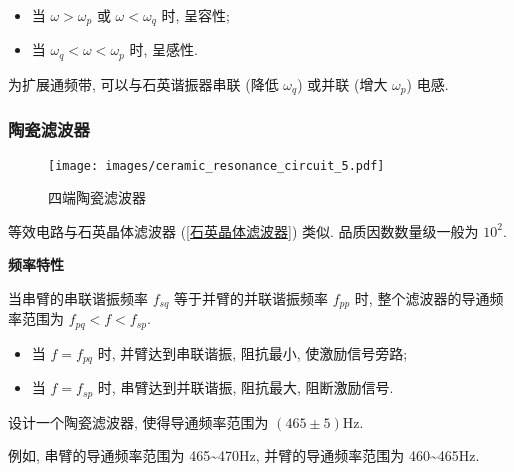 \begin{itemize}
    \item 当 $\omega>\omega_p$ 或 $\omega<\omega_q$ 时, 呈容性;
    \item 当 $\omega_q<\omega<\omega_p$ 时, 呈感性.
\end{itemize}

为扩展通频带, 可以与石英谐振器串联 (降低 $\omega_q$) 或并联 (增大 $\omega_p$) 电感.

\subsubsection{陶瓷滤波器}

\begin{wrapfigure}{r}{.3\textwidth}
    \centering
    \texttt{[image: images/ceramic\_resonance\_circuit\_5.pdf]}
    \caption{四端陶瓷滤波器}
\end{wrapfigure}

等效电路与石英晶体滤波器 (\ref{石英晶体滤波器}) 类似. 品质因数数量级一般为 $10^2$.

\textbf{频率特性}

当串臂的串联谐振频率 $f_{sq}$ 等于并臂的并联谐振频率 $f_{pp}$ 时, 整个滤波器的导通频率范围为 $f_{pq}<f<f_{sp}$.

\begin{itemize}
    \item 当 $f=f_{pq}$ 时, 并臂达到串联谐振, 阻抗最小, 使激励信号旁路;
    \item 当 $f=f_{sp}$ 时, 串臂达到并联谐振, 阻抗最大, 阻断激励信号.
\end{itemize}

\begin{exampleprob}
    设计一个陶瓷滤波器, 使得导通频率范围为 $(465\pm5)$Hz.

    \begin{solution}
        例如, 串臂的导通频率范围为 465\textasciitilde 470Hz, 并臂的导通频率范围为 460\textasciitilde 465Hz.
    \end{solution}
\end{exampleprob}
